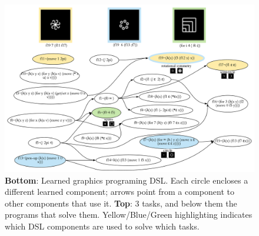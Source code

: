 \documentclass{article}
\begin{document}
\begin{figure}
  \includegraphics[width = \textwidth]{figures/DeepLogo.pdf}
  \caption{\textbf{Bottom}: Learned graphics programing DSL. Each circle encloses a different learned component; arrows point from a component to other components that use it. \textbf{Top}: 3 tasks, and below them the programs that solve them. Yellow/Blue/Green highlighting indicates which DSL components are used to solve which tasks.}
  \end{figure}
\end{document}
